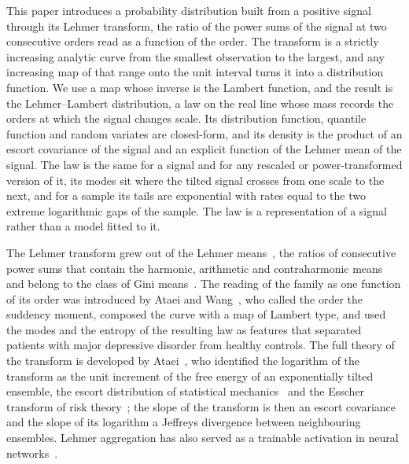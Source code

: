 \documentclass[sn-mathphys-num]{sn-jnl}\newcommand{\SNJNL}{}
\theoremstyle{thmstyleone}
\theoremstyle{thmstyletwo}
\theoremstyle{thmstylethree}
\theoremstyle{thmstyleone}
\begin{document}
	This paper introduces a probability distribution built from a
	positive signal through its Lehmer transform, the ratio of the power
	sums of the signal at two consecutive orders read as a function of
	the order. The transform is a strictly increasing analytic curve
	from the smallest observation to the largest, and any increasing map
	of that range onto the unit interval turns it into a distribution
	function. We use a map whose inverse is the Lambert function, and
	the result is the Lehmer--Lambert distribution, a law on the real
	line whose mass records the orders at which the signal changes
	scale. Its distribution function, quantile function and random
	variates are closed-form, and its density is the product of an escort covariance of the
	signal and an explicit function of the Lehmer mean of the signal. The law is the same for a signal and for any
	rescaled or power-transformed version of it, its modes sit where the
	tilted signal crosses from one scale to the next, and for a sample its tails are exponential with rates equal to
	the two extreme logarithmic gaps of the sample. The law is a representation of a signal rather than a model fitted
	to it.
	
	The Lehmer transform grew out of the Lehmer means~\cite{lehmer1971},
	the ratios of consecutive power sums that contain the harmonic,
	arithmetic and contraharmonic means and belong to the class of Gini
	means~\cite{gini1938}. The reading of the family as one
	function of its order was introduced by Ataei and
	Wang~\cite{ataei2022}, who called the order the suddency moment,
	composed the curve with a map of Lambert type, and used the modes
	and the entropy of the resulting law as features that separated
	patients with major depressive disorder from healthy controls. The
	full theory of the transform is developed by Ataei~\cite{ataei2026},
	who identified the logarithm of the transform as the unit increment
	of the free energy of an exponentially tilted ensemble, the escort
	distribution of statistical mechanics~\cite{beck1993}
	and the Esscher transform of risk theory~\cite{esscher1932}; the
	slope of the transform is then an escort covariance and the slope
	of its logarithm a Jeffreys divergence between neighbouring
	ensembles. Lehmer aggregation has also served as a trainable activation in
	neural networks~\cite{ataei2025}.
	
\end{document}
